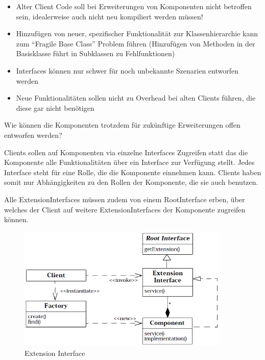 \begin{itemize}
	\item Alter Client Code soll bei Erweiterungen von Komponenten nicht betroffen sein, idealerweise auch nicht neu kompiliert werden müssen!
	\item Hinzufügen von neuer, spezifischer Funktionalität zur Klassenhierarchie kann zum ``Fragile Base Class'' Problem führen (Hinzufügen von Methoden in der Basisklasse führt in Subklassen zu Fehlfunktionen)
	\item Interfaces können nur schwer für noch unbekannte Szenarien entworfen werden
	\item Neue Funktionalitäten sollen nicht zu Overhead bei alten Clients führen, die diese gar nicht benötigen
\end{itemize}

Wie können die Komponenten trotzdem für zukünftige Erweiterungen offen entworfen werden?

Clients sollen auf Komponenten via einzelne Interfaces Zugreifen statt das die Komponente alle Funktionalitäten über ein Interface zur Verfügung stellt. Jedes Interface steht für eine Rolle, die die Komponente einnehmen kann. Clients haben somit nur Abhängigkeiten zu den Rollen der Komponente, die sie auch benutzen.

Alle ExtensionInterfaces müssen zudem von einem RootInterface erben, über welches der Client auf weitere ExtensionInterfaces der Komponente zugreifen können.

\begin{figure}[H]
	\centering
	\includegraphics[width=0.9\textwidth]{content/advancedPatterns/extensioninterface.jpg}
	\caption{Extension Interface}
\end{figure}

